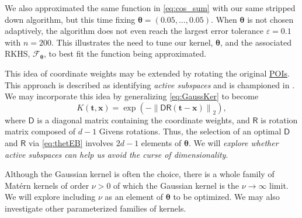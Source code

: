 \documentclass[11pt]{NSFamsart}
\newcommand{\Upara}[1]{\noindent\underline{\upshape #1}:}
\newcommand{\POIs}{\hyperlink{POIlink}{POIs}\xspace}
\DeclareMathOperator{\STREND}{ST} %
\newcommand{\mD}{\mathsf{D}}
\newcommand{\mR}{\mathsf{R}}
\newcommand{\bx}{{\boldsymbol{x}}}
\newcommand{\bt}{{\boldsymbol{t}}}
\newcommand{\btheta}{{\boldsymbol{\theta}}}
\newcommand{\calf}{{\mathcal{F}}}
\newcommand{\calp}{{\mathcal{P}}}
\newcommand{\norm}[2][{}]{\ensuremath{\left \lVert #2 \right \rVert}_{#1}}
\begin{document}
We also approximated the same function in \eqref{eq:cos_sum} with our same stripped down algorithm, but this time fixing $\btheta = (0.05, \ldots, 0.05)$. When $\btheta$ is not chosen adaptively, the algorithm does not even reach the largest error tolerance $\varepsilon = 0.1$ with $n = 200$. This illustrates the need to tune our kernel, $\btheta$, and the associated RKHS, $\calf_\btheta$, to best fit the function being approximated.

This idea of coordinate weights may be extended by rotating the original \POIs. This approach is described as identifying \emph{active subspaces} and is championed in \cite{constantine2015active}. We may incorporate this idea by generalizing \eqref{eq:GaussKer} to become 
\begin{equation} \label{eq:multisqExpD}
	K(\bt,\bx) = \exp(-\norm[2]{\mD \mR(\bt-\bx)}), 
\end{equation}
where $\mD$ is a diagonal matrix containing the coordinate weights, and $\mR$ is rotation matrix composed of $d-1$ Givens rotations.  Thus, the selection of an optimal $\mD$ and $\mR$ via \eqref{eq:thetEB}  involves $2d-1$  elements of $\btheta$.  We will \emph{explore whether active subspaces can help us avoid the curse of dimensionality}.

Although the Gaussian kernel is often the choice, there is a whole family of Mat\'ern kernels of order $\nu >0$ of which the Gaussian kernel is the $\nu \to \infty$ limit.  We will explore including $\nu$ as an element of $\btheta$ to be optimized.  We may also investigate other parameterized families of kernels.

\end{document}
